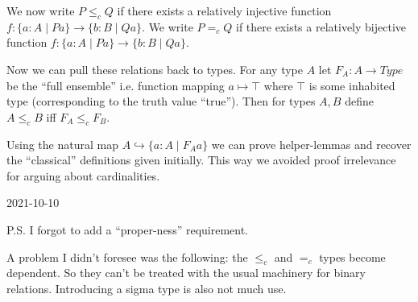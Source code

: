 \documentclass{article}
\begin{document}
We now write $P \le_c Q$ if there exists a relatively injective function $f : \{ a : A \mid P a \} \to \{ b : B \mid Q a \}$.
We write $P =_c Q$ if there exists a relatively bijective function $f : \{ a : A \mid P a \} \to \{ b : B \mid Q a \}$.

Now we can pull these relations back to types.
For any type $A$ let $F_A : A \to Type$ be the “full ensemble” i.e. function mapping $a \mapsto \top$ where $\top$ is some inhabited type (corresponding to the truth value “true”).
Then for types $A, B$ define $A \le_c B$ iff $F_A \le_c F_B$.

Using the natural map $A \hookrightarrow \{ a : A \mid F_A a \}$ we can prove helper-lemmas and recover the “classical” definitions given initially.
This way we avoided proof irrelevance for arguing about cardinalities.

2021-10-10

P.S. I forgot to add a “proper-ness” requirement.

A problem I didn’t foresee was the following: the $\le_c$ and $=_c$ types become dependent.
So they can’t be treated with the usual machinery for binary relations.
Introducing a sigma type is also not much use.
\end{document}
